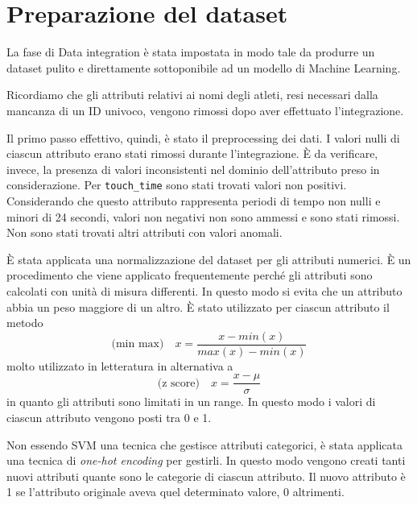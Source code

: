 
\section{Preparazione del dataset}

La fase di Data integration è stata impostata in modo tale da produrre un dataset pulito e direttamente sottoponibile ad un modello di Machine Learning.

Ricordiamo che gli attributi relativi ai nomi degli atleti, resi necessari dalla mancanza di un ID univoco, vengono rimossi dopo aver effettuato l'integrazione.

Il primo passo effettivo, quindi, è stato il preprocessing dei dati. I valori nulli di ciascun attributo erano stati rimossi durante l'integrazione. È da verificare, invece, la presenza di valori inconsistenti nel dominio dell'attributo preso in considerazione.
Per \texttt{touch\_time} sono stati trovati valori non positivi. Considerando che questo attributo rappresenta periodi di tempo non nulli e minori di 24 secondi, valori non negativi non sono ammessi e sono stati rimossi.
Non sono stati trovati altri attributi con valori anomali.

\par

È stata applicata una normalizzazione del dataset per gli attributi numerici. È un procedimento che viene applicato frequentemente perché gli attributi sono calcolati con unità di misura differenti. In questo modo si evita che un attributo abbia un peso maggiore di un altro. È stato utilizzato per ciascun attributo il metodo
\begin{equation}
\text{(min max)}\quad x = \dfrac{x - min(x)}{max(x) - min(x)}
\end{equation}
molto utilizzato in letteratura in alternativa a
\begin{equation}
\text{(z score)}\quad x = \dfrac{x - \mu}{\sigma}
\end{equation}
in quanto gli attributi sono limitati in un range. In questo modo i valori di ciascun attributo vengono posti tra 0 e 1.

\par
Non essendo SVM una tecnica che gestisce attributi categorici, è stata applicata una tecnica di \textit{one-hot encoding} per gestirli. In questo modo vengono creati tanti nuovi attributi quante sono le categorie di ciascun attributo. Il nuovo attributo è 1 se l'attributo originale aveva quel determinato valore, 0 altrimenti.
